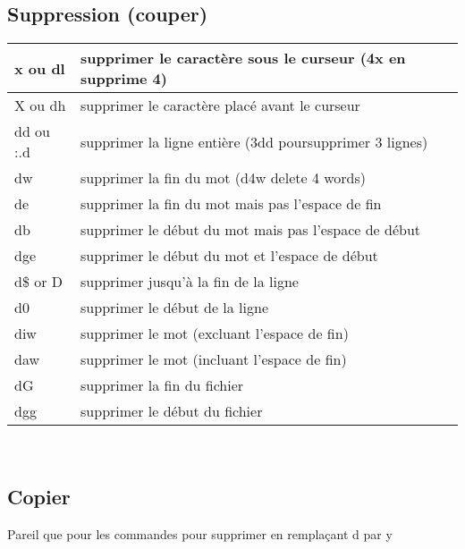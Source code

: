 \documentclass{article}
\begin{document}
\subsection{Suppression (couper)}
\begin{tabular}{|p{3cm}| l| }\hline
x ou dl & supprimer le caractère sous le curseur (4x en supprime 4)\\ \hline
X ou dh & supprimer le caractère placé avant le curseur\\ \hline
dd ou :.d & supprimer la ligne entière (3dd poursupprimer 3 lignes)\\ \hline
dw & supprimer la fin du mot (d4w delete 4 words)\\ \hline
de & supprimer la fin du mot mais pas l'espace de fin \\ \hline
db & supprimer le début du mot mais pas l'espace de début\\ \hline
dge & supprimer le début du mot et l'espace de début\\ \hline
d\$ or D & supprimer jusqu'à la fin de la ligne\\ \hline
d0 & supprimer le début de la ligne\\ \hline
diw & supprimer le mot (excluant l'espace de fin)\\ \hline
daw & supprimer le mot (incluant l'espace de fin)\\ \hline
dG & supprimer la fin du fichier\\ \hline
dgg & supprimer le début du fichier\\ \hline
\end{tabular}\\


\subsection{Copier}
Pareil que pour les commandes pour supprimer en remplaçant d par y\\
\end{document}
